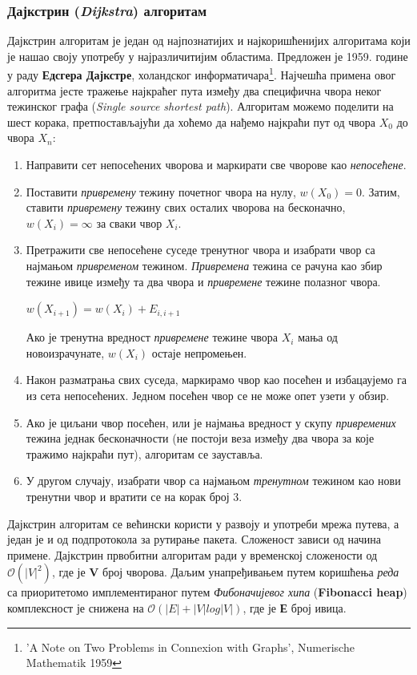 \documentclass[11pt, oneside, a4paper]{article}
\begin{document}
\subsubsection*{Дајкстрин (\textit{Dijkstra}) алгоритам}
Дајкстрин алгоритам је један од најпознатијих и најкоришћенијих алгоритама који је нашао своју употребу у најразличитијим областима. Предложен је 1959. године у раду \textbf{Едсгера Дајкстре}, холандског информатичара\footnote{’A Note on Two Problems in Connexion with Graphs’, Numerische Mathematik 1959}. Најчешћа примена овог алгоритма јесте тражење најкраћег пута између два специфична чвора неког тежинског графа (\textit{Single source shortest path}). Алгоритам можемо поделити на шест корака, претпостављајући да хоћемо да нађемо најкраћи пут од чвора $X_0$ до чвора $X_n$:
\begin{enumerate}
    \item Направити сет непосећених чворова и маркирати све чворове као \textit{непосећене}.
    \item Поставити \textit{привремену} тежину почетног чвора на нулу, $w(X_0) = 0$. Затим, ставити  \textit{привремену} тежину свих осталих чворова на бесконачно, $w(X_i)=\infty$ за сваки чвор \textit{$X_i$}.
    \item Претражити све непосећене суседе тренутног чвора и изабрати чвор са најмањом \textit{привременом} тежином. \textit{Привремена} тежина се рачуна као збир тежине ивице између та два чвора и \textit{привремене} тежине полазног чвора.\\
    \begin{center}
            $w(X_{i+1}) = w(X_{i}) + E_{i, i+1}$  
    \end{center}
    Ако је тренутна вредност \textit{привремене} тежине чвора $X_i$ мања од новоизрачунате, $w(X_i)$ остаје непромењен.
    \item Након разматрања свих суседа, маркирамо чвор као посећен и избацаујемо га из сета непосећених. Једном посећен чвор се не може опет узети у обзир.
    \item Ако је циљани чвор посећен, или је најмања вредност у скупу \textit{привремених} тежина једнак бесконачности (не постоји веза између два чвора за које тражимо најкраћи пут), алгоритам се зауставља.
    \item У другом случају, изабрати чвор са најмањом \textit{тренутном} тежином као нови тренутни чвор и вратити се на корак број 3.

\end{enumerate}
Дајкстрин алгоритам се већински користи у развоју и употреби мрежа путева, а један је и од подпротокола за рутирање пакета. Сложеност зависи од начина примене. Дајкстрин првобитни алгоритам ради у временској сложености од $\mathcal{O}(|V|^2)$, где је \textbf{V} број чворова. Даљим унапређивањем путем коришћења \textit{реда} са приоритетомо имплементираног путем \textit{Фибоначијевог хипа}  (\textbf{Fibonacci heap}) комплексност је снижена на $\mathcal{O}(|E| + |V|log|V|)$, где је \textbf{Е} број ивица.
\end{document}

